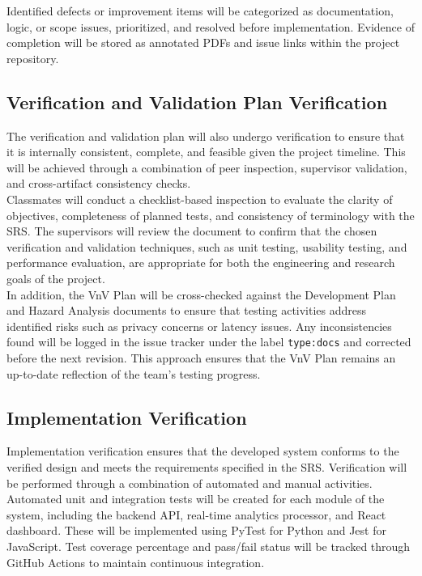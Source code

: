 \documentclass[12pt, titlepage]{article}
\begin{document}
Identified defects or improvement items will be categorized as documentation, logic, or scope issues, prioritized, and resolved before implementation. Evidence of completion will be stored as annotated PDFs and issue links within the project repository.\\

\subsection{Verification and Validation Plan Verification}

The verification and validation plan will also undergo verification to ensure that it is internally consistent, complete, and feasible given the project timeline. This will be achieved through a combination of peer inspection, supervisor validation, and cross-artifact consistency checks.\\

Classmates will conduct a checklist-based inspection to evaluate the clarity of objectives, completeness of planned tests, and consistency of terminology with the SRS. The supervisors will review the document to confirm that the chosen verification and validation techniques, such as unit testing, usability testing, and performance evaluation, are appropriate for both the engineering and research goals of the project.\\

In addition, the VnV Plan will be cross-checked against the Development Plan and Hazard Analysis documents to ensure that testing activities address identified risks such as privacy concerns or latency issues. Any inconsistencies found will be logged in the issue tracker under the label \texttt{type:docs} and corrected before the next revision. This approach ensures that the VnV Plan remains an up-to-date reflection of the team’s testing progress.\\

\subsection{Implementation Verification}

Implementation verification ensures that the developed system conforms to the verified design and meets the requirements specified in the SRS. Verification will be performed through a combination of automated and manual activities.\\

Automated unit and integration tests will be created for each module of the system, including the backend API, real-time analytics processor, and React dashboard. These will be implemented using PyTest for Python and Jest for JavaScript. Test coverage percentage and pass/fail status will be tracked through GitHub Actions to maintain continuous integration.\\
\end{document}
